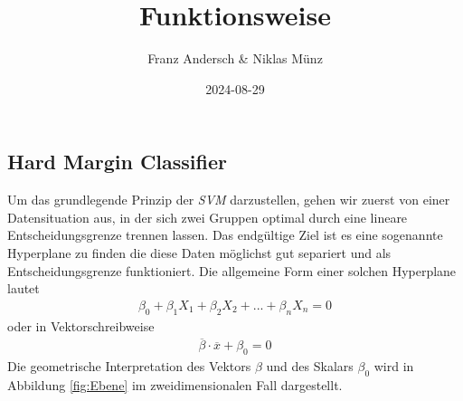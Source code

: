 \documentclass[
]{article}
\title{Funktionsweise}
\author{Franz Andersch \& Niklas Münz}
\date{2024-08-29}
\renewcommand{\maketitle}{}
\begin{document}
\maketitle

\subsection{Hard Margin Classifier}

Um das grundlegende Prinzip der \textit{SVM} darzustellen, gehen wir
zuerst von einer Datensituation aus, in der sich zwei Gruppen optimal
durch eine lineare Entscheidungsgrenze trennen lassen. Das endgültige
Ziel ist es eine sogenannte Hyperplane zu finden die diese Daten
möglichst gut separiert und als Entscheidungsgrenze funktioniert. Die
allgemeine Form einer solchen Hyperplane lautet \begin{align}
\beta_0+ \beta_1 X_1+\beta_2 X_2+...+\beta_n X_n=0\label{eq:hyperebene}
\end{align} oder in Vektorschreibweise \begin{align}
\overline{\beta}\cdot\overline{x}+\beta_0=0 \label{eq:hyperplanevec}
\end{align} Die geometrische Interpretation des Vektors \(\beta\) und
des Skalars \(\beta_0\) wird in Abbildung \ref{fig:Ebene} im
zweidimensionalen Fall dargestellt.
\end{document}
